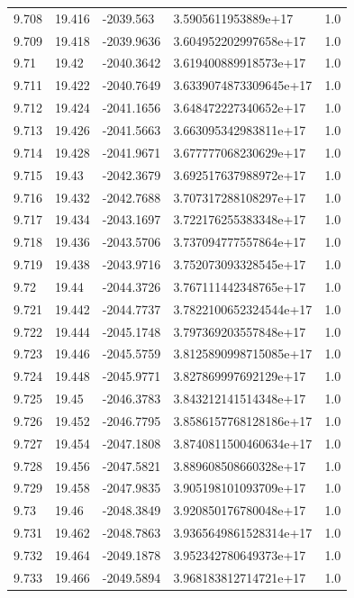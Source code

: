 \begin{tabular}{lllll}
9.708 & 19.416 & -2039.563 & 3.5905611953889e+17 & 1.0 \\
9.709 & 19.418 & -2039.9636 & 3.604952202997658e+17 & 1.0 \\
9.71 & 19.42 & -2040.3642 & 3.619400889918573e+17 & 1.0 \\
9.711 & 19.422 & -2040.7649 & 3.6339074873309645e+17 & 1.0 \\
9.712 & 19.424 & -2041.1656 & 3.648472227340652e+17 & 1.0 \\
9.713 & 19.426 & -2041.5663 & 3.663095342983811e+17 & 1.0 \\
9.714 & 19.428 & -2041.9671 & 3.677777068230629e+17 & 1.0 \\
9.715 & 19.43 & -2042.3679 & 3.692517637988972e+17 & 1.0 \\
9.716 & 19.432 & -2042.7688 & 3.707317288108297e+17 & 1.0 \\
9.717 & 19.434 & -2043.1697 & 3.722176255383348e+17 & 1.0 \\
9.718 & 19.436 & -2043.5706 & 3.737094777557864e+17 & 1.0 \\
9.719 & 19.438 & -2043.9716 & 3.752073093328545e+17 & 1.0 \\
9.72 & 19.44 & -2044.3726 & 3.767111442348765e+17 & 1.0 \\
9.721 & 19.442 & -2044.7737 & 3.7822100652324544e+17 & 1.0 \\
9.722 & 19.444 & -2045.1748 & 3.797369203557848e+17 & 1.0 \\
9.723 & 19.446 & -2045.5759 & 3.8125890998715085e+17 & 1.0 \\
9.724 & 19.448 & -2045.9771 & 3.827869997692129e+17 & 1.0 \\
9.725 & 19.45 & -2046.3783 & 3.843212141514348e+17 & 1.0 \\
9.726 & 19.452 & -2046.7795 & 3.8586157768128186e+17 & 1.0 \\
9.727 & 19.454 & -2047.1808 & 3.8740811500460634e+17 & 1.0 \\
9.728 & 19.456 & -2047.5821 & 3.889608508660328e+17 & 1.0 \\
9.729 & 19.458 & -2047.9835 & 3.905198101093709e+17 & 1.0 \\
9.73 & 19.46 & -2048.3849 & 3.920850176780048e+17 & 1.0 \\
9.731 & 19.462 & -2048.7863 & 3.9365649861528314e+17 & 1.0 \\
9.732 & 19.464 & -2049.1878 & 3.952342780649373e+17 & 1.0 \\
9.733 & 19.466 & -2049.5894 & 3.968183812714721e+17 & 1.0 \\

\end{tabular}
